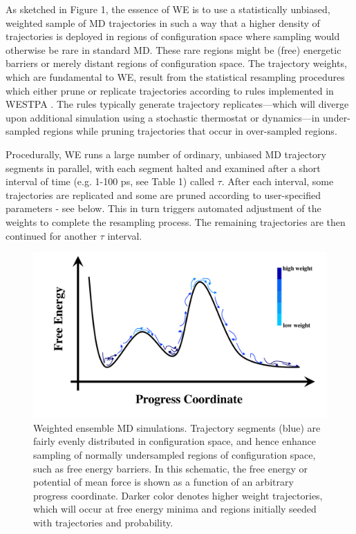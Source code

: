 \documentclass[9pt,tutorial,pubversion]{livecoms}
\begin{document}
As sketched in Figure 1, the essence of WE is to use a statistically unbiased, weighted sample of MD trajectories in such a way that a higher density of trajectories is deployed in regions of configuration space where sampling would otherwise be rare in standard MD. 
These rare regions might be (free) energetic barriers or merely distant regions of configuration space. 
The trajectory weights, which are fundamental to WE, result from the statistical resampling procedures which either prune or replicate trajectories according to rules implemented in WESTPA \citep{HuberKim1996,Zhang2010,Zwier2015}. 
The rules typically generate trajectory replicates---which will diverge upon additional simulation using a stochastic thermostat or dynamics---in under-sampled regions while pruning trajectories that occur in over-sampled regions.  

Procedurally, WE runs a large number of ordinary, unbiased MD trajectory segments in parallel, with each segment halted and examined after a short interval of time (e.g. 1-100 ps, see Table 1) called $\tau$. 
After each interval, some trajectories are replicated and some are pruned according to user-specified parameters - see below. 
This in turn triggers automated adjustment of the weights to complete the resampling process. 
The remaining trajectories are then continued for another $\tau$ interval.

\begin{figure}
\includegraphics[width=\linewidth]{Figure1.png}
\caption{Weighted ensemble MD simulations. 
Trajectory segments (blue) are fairly evenly distributed in configuration space, and hence enhance sampling of normally undersampled regions of configuration space, such as free energy barriers. 
In this schematic, the free energy or potential of mean force is shown as a function of an arbitrary progress coordinate.
Darker color denotes higher weight trajectories, which will occur at free energy minima and regions initially seeded with trajectories and probability.}
\label{fig:view}
\end{figure}
\end{document}
